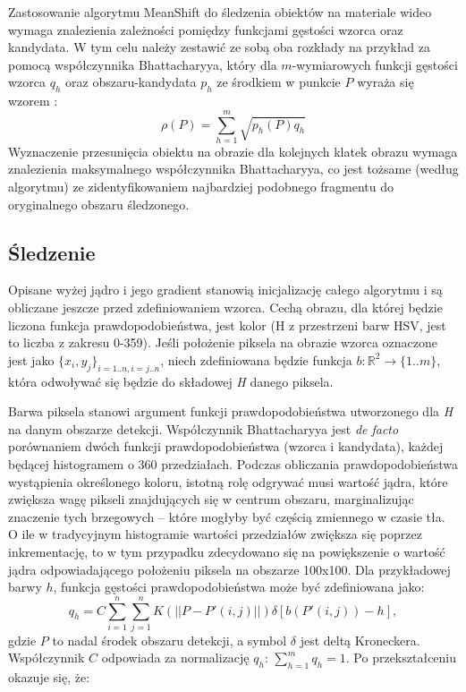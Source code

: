Zastosowanie algorytmu MeanShift do śledzenia obiektów na materiale
wideo wymaga znalezienia zależności pomiędzy funkcjami gęstości wzorca oraz kandydata. 
W tym celu należy zestawić ze sobą oba rozkłady na przykład za pomocą współczynnika Bhattacharyya, który dla $m$-wymiarowych funkcji gęstości wzorca $q_h$ oraz obszaru-kandydata $p_h$ ze środkiem w punkcie $P$ wyraża się wzorem \cite{Comaniciu}:
\begin{equation}
\label{eq:Bhat}
\rho(P)=\sum_{h=1}^{m}\sqrt{p_h(P)q_h}
\end{equation}
Wyznaczenie przesunięcia obiektu na obrazie dla kolejnych klatek obrazu wymaga znalezienia maksymalnego współczynnika Bhattacharyya, co jest tożsame (według algorytmu) ze zidentyfikowaniem najbardziej podobnego fragmentu do oryginalnego obszaru śledzonego.

\subsection{Śledzenie}

Opisane wyżej jądro i jego gradient stanowią inicjalizację całego algorytmu i są obliczane jeszcze przed zdefiniowaniem wzorca. 
Cechą obrazu, dla której będzie liczona funkcja prawdopodobieństwa, jest kolor (H z przestrzeni barw HSV, jest to liczba z zakresu 0-359). 
Jeśli położenie piksela na obrazie wzorca oznaczone jest jako $\{x_{i},y_{j}\}_{i=1..n,i=j..n}$, niech zdefiniowana będzie funkcja $b:\mathbb{R}^2\rightarrow\{1..m\}$, która odwoływać się będzie do składowej \textit{H} danego piksela.

Barwa piksela stanowi argument funkcji prawdopodobieństwa utworzonego dla \textit{H} na danym obszarze detekcji. %
Współczynnik Bhattacharyya jest \textit{de facto} porównaniem dwóch funkcji prawdopodobieństwa (wzorca i kandydata), każdej będącej histogramem o 360 przedziałach. %
Podczas obliczania prawdopodobieństwa wystąpienia określonego koloru, istotną rolę odgrywać musi wartość jądra, które zwiększa wagę pikseli znajdujących się w centrum obszaru, marginalizując znaczenie tych brzegowych -- które mogłyby być częścią zmiennego w czasie tła. 
O ile w tradycyjnym histogramie wartości przedziałów zwiększa się poprzez inkrementację, to w tym przypadku zdecydowano się na powiększenie o wartość jądra odpowiadającego położeniu piksela na obszarze 100x100.
Dla przykładowej barwy $h$, funkcja gęstości prawdopodobieństwa może być zdefiniowana jako:
\begin{equation}
q_h=C\sum_{i=1}^{n}\sum_{j=1}^{n}K(||P-P'(i,j)||)\delta[b(P'(i,j))-h],
\end{equation}
gdzie $P$ to nadal środek obszaru detekcji, a symbol $\delta$ jest deltą Kroneckera. Współczynnik $C$ odpowiada za normalizację $q_h$: $\sum_{h=1}^{m}q_h=1$.
Po przekształceniu okazuje się, że:


